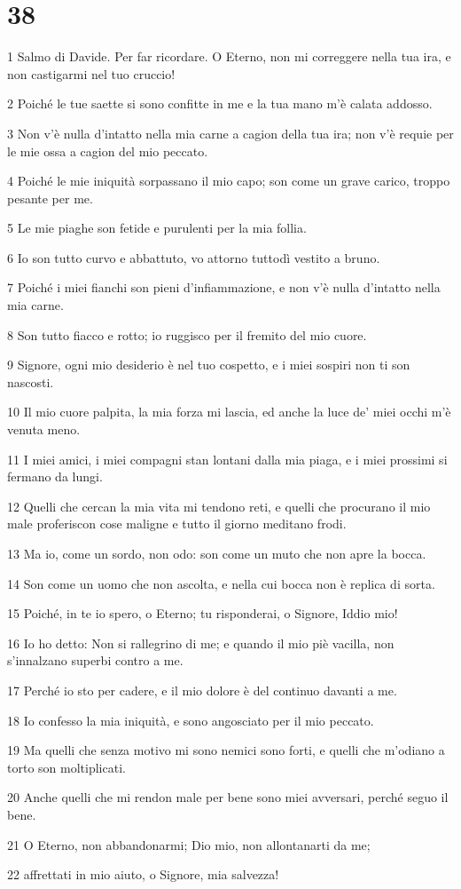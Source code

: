 \chapter{38}

\par 1 Salmo di Davide. Per far ricordare. O Eterno, non mi correggere nella tua ira, e non castigarmi nel tuo cruccio!
\par 2 Poiché le tue saette si sono confitte in me e la tua mano m'è calata addosso.
\par 3 Non v'è nulla d'intatto nella mia carne a cagion della tua ira; non v'è requie per le mie ossa a cagion del mio peccato.
\par 4 Poiché le mie iniquità sorpassano il mio capo; son come un grave carico, troppo pesante per me.
\par 5 Le mie piaghe son fetide e purulenti per la mia follia.
\par 6 Io son tutto curvo e abbattuto, vo attorno tuttodì vestito a bruno.
\par 7 Poiché i miei fianchi son pieni d'infiammazione, e non v'è nulla d'intatto nella mia carne.
\par 8 Son tutto fiacco e rotto; io ruggisco per il fremito del mio cuore.
\par 9 Signore, ogni mio desiderio è nel tuo cospetto, e i miei sospiri non ti son nascosti.
\par 10 Il mio cuore palpita, la mia forza mi lascia, ed anche la luce de' miei occhi m'è venuta meno.
\par 11 I miei amici, i miei compagni stan lontani dalla mia piaga, e i miei prossimi si fermano da lungi.
\par 12 Quelli che cercan la mia vita mi tendono reti, e quelli che procurano il mio male proferiscon cose maligne e tutto il giorno meditano frodi.
\par 13 Ma io, come un sordo, non odo: son come un muto che non apre la bocca.
\par 14 Son come un uomo che non ascolta, e nella cui bocca non è replica di sorta.
\par 15 Poiché, in te io spero, o Eterno; tu risponderai, o Signore, Iddio mio!
\par 16 Io ho detto: Non si rallegrino di me; e quando il mio piè vacilla, non s'innalzano superbi contro a me.
\par 17 Perché io sto per cadere, e il mio dolore è del continuo davanti a me.
\par 18 Io confesso la mia iniquità, e sono angosciato per il mio peccato.
\par 19 Ma quelli che senza motivo mi sono nemici sono forti, e quelli che m'odiano a torto son moltiplicati.
\par 20 Anche quelli che mi rendon male per bene sono miei avversari, perché seguo il bene.
\par 21 O Eterno, non abbandonarmi; Dio mio, non allontanarti da me;
\par 22 affrettati in mio aiuto, o Signore, mia salvezza!

